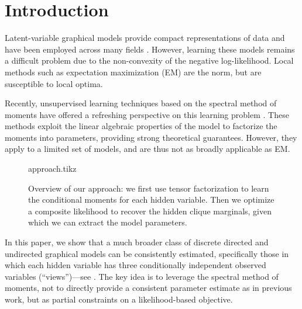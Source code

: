 \section{Introduction}
\label{sec:introduction}

Latent-variable graphical models provide compact representations of data
and have been employed across many fields %
\cite{ghahramani1999variational,jaakkola1999variational,blei03lda,quattoni04crf,beaumont2004bayesian,haghighi06prototype}.
However, learning these models remains a difficult problem due to the
non-convexity of the negative log-likelihood.  Local methods such as expectation maximization (EM)
are the norm, but are susceptible to local optima.

Recently, unsupervised learning techniques based on the spectral method of moments
have offered a refreshing perspective on
this learning problem
\citep{mossel2005learning,
hsu09spectral,
bailly2010spectral,
song2011spectral,
anandkumar11tree,
anandkumar12lda,
anandkumar12moments,
hsu12identifiability,
balle12automata}.
These methods exploit the linear algebraic properties of the model to
factorize the moments into parameters, providing strong theoretical guarantees.
However, they apply to a limited set of models, and are thus
not as broadly applicable as EM.

\begin{figure}[t]
  \label{fig:approach}
  \centering
  {approach.tikz}
  \caption{
  Overview of our approach: we first use tensor factorization to learn the conditional moments for each hidden variable.
  Then we optimize a composite likelihood to recover the hidden clique marginals,
  given which we can extract the model parameters.
  }
\end{figure}


In this paper,
we show that a much broader class of discrete directed and undirected graphical models can be consistently estimated,
specifically those in which each hidden variable has three conditionally
independent observed variables (``views'')---see .
The key idea is to leverage the spectral method of moments,
not to directly provide a consistent parameter estimate as in previous work,
but as partial constraints on a likelihood-based objective.

